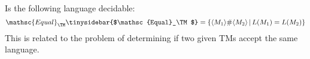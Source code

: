 Is the following language decidable:
\[
\mathsc{Equal}_\TM
\tinysidebar{$\mathsc{Equal}_\TM$}\index{equal$\mathsc{Equal}_\TM$}
=
\{
\langle M_1 \rangle
\#
\langle M_2 \rangle
\,|\, L(M_1) =  L(M_2)
\}
\]
This is related to the problem of determining if
two given TMs accept the same language.
